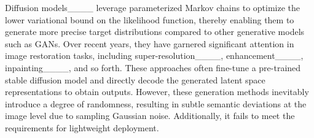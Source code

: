 Diffusion models____ leverage parameterized Markov chains to optimize the lower variational bound on the likelihood function, thereby enabling them to generate more precise target distributions compared to other generative models such as GANs. Over recent years, they have garnered significant attention in image restoration tasks, including super-resolution____, enhancement____, inpainting____, and so forth. 
These approaches often fine-tune a pre-trained stable diffusion model and directly decode the generated latent space representations to obtain outputs. However, these generation methods inevitably introduce a degree of randomness, resulting in subtle semantic deviations at the image level due to sampling Gaussian noise. Additionally, it fails to meet the requirements for lightweight deployment.
